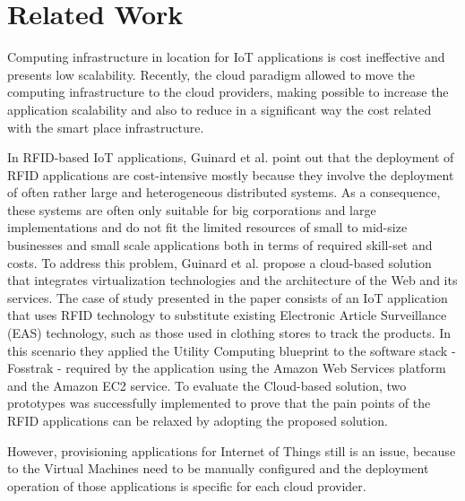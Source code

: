 \section{Related Work}
\label{sec:related_work}
Computing infrastructure in location for IoT applications is cost ineffective and presents low scalability.
Recently, the cloud paradigm allowed to move the computing infrastructure to the cloud providers,
making possible to increase the application scalability and also to reduce in a significant way the cost
related with the smart place infrastructure.

In RFID-based IoT applications, Guinard et al. \cite{guinard2011cloud} point out that the
deployment of RFID applications are cost-intensive mostly because they involve the
deployment of often rather large and heterogeneous distributed systems. As a consequence,
these systems are often only suitable for big corporations and large implementations and
do not fit the limited resources of small to mid-size businesses and small scale applications
both in terms of required skill-set and costs. To address this problem, Guinard et al. propose
a cloud-based solution that integrates virtualization technologies and the architecture of
the Web and its services. The case of study presented in the paper consists of an IoT application
that uses RFID technology to substitute existing Electronic Article Surveillance (EAS) technology,
such as those used in clothing stores to track the products. In this scenario they applied the
Utility Computing blueprint to the software stack - Fosstrak - required by the application using
the Amazon Web Services platform and the Amazon EC2 service. To evaluate the Cloud-based solution,
two prototypes was successfully implemented to prove that the pain points of the RFID applications
can be relaxed by adopting the proposed solution.

However, provisioning applications for Internet of Things still is an issue, because to the Virtual Machines
need to be manually configured and the deployment operation of those applications is specific for each
cloud provider.

